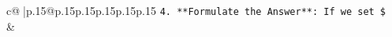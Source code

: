 \documentclass{article}
\begin{document}
{\begin{supertabular}{c@{$\;$}|p{.15\linewidth}@{}p{.15\linewidth}p{.15\linewidth}p{.15\linewidth}p{.15\linewidth}p{.15\linewidth}}
{{{\texttt{4.  **Formulate the Answer**: If we set \$} \\
            }
        }
    }
    & \\ \\

\end{supertabular}
}
\end{document}
